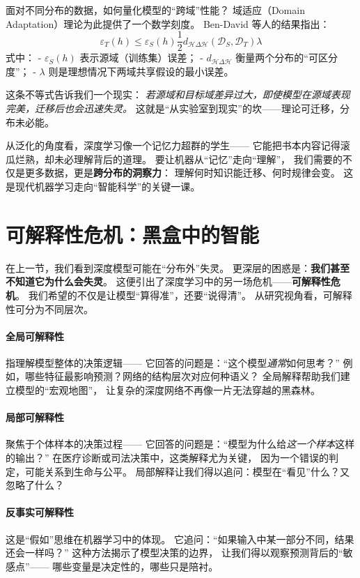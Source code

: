 面对不同分布的数据，如何量化模型的“跨域”性能？  
域适应（Domain Adaptation）理论为此提供了一个数学刻度。  
Ben-David 等人的结果指出：  
$$\varepsilon_T(h) \leq \varepsilon_S(h)  \frac{1}{2}d_{\mathcal{H}\Delta\mathcal{H}}(\mathcal{D}_S, \mathcal{D}_T)  \lambda$$  
式中：  
- $\varepsilon_S(h)$ 表示源域（训练集）误差；  
- $d_{\mathcal{H}\Delta\mathcal{H}}$ 衡量两个分布的“可区分度”；  
- $\lambda$ 则是理想情况下两域共享假设的最小误差。  

这条不等式告诉我们一个现实：  
\textit{若源域和目标域差异过大，即使模型在源域表现完美，迁移后也会迅速失灵。}  
这就是“从实验室到现实”的坎——理论可迁移，分布未必能。

从泛化的角度看，深度学习像一个记忆力超群的学生——  
它能把书本内容记得滚瓜烂熟，却未必理解背后的道理。  
要让机器从“记忆”走向“理解”，  
我们需要的不仅是更多数据，更是\textbf{跨分布的洞察力}：  
理解何时知识能迁移、何时规律会变。  
这是现代机器学习走向“智能科学”的关键一课。

\section{可解释性危机：黑盒中的智能}

在上一节，我们看到深度模型可能在“分布外”失灵。  
更深层的困惑是：\textbf{我们甚至不知道它为什么会失灵}。  
这便引出了深度学习中的另一场危机——\textbf{可解释性危机}。  
我们希望的不仅是让模型“算得准”，还要“说得清”。  
从研究视角看，可解释性可分为不同层次。

\paragraph{全局可解释性}  
指理解模型整体的决策逻辑——  
它回答的问题是：“这个模型\textit{通常}如何思考？”  
例如，哪些特征最影响预测？网络的结构层次对应何种语义？  
全局解释帮助我们建立模型的“宏观地图”，  
让复杂的深度网络不再像一片无法穿越的黑森林。

\paragraph{局部可解释性}  
聚焦于个体样本的决策过程——  
它回答的问题是：“模型为什么给\textit{这一个样本}这样的输出？”  
在医疗诊断或司法决策中，这类解释尤为关键，  
因为一个错误的判定，可能关系到生命与公平。  
局部解释让我们得以追问：模型在“看见”什么？又忽略了什么？

\paragraph{反事实可解释性}  
这是“假如”思维在机器学习中的体现。  
它追问：“如果输入中某一部分不同，结果还会一样吗？”  
这种方法揭示了模型决策的边界，  
让我们得以观察预测背后的“敏感点”——  
哪些变量是决定性的，哪些只是陪衬。

